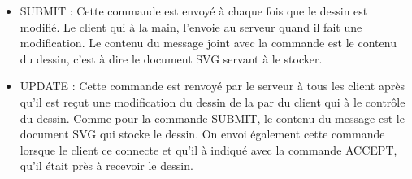 \documentclass[a4paper,10pt]{article}
\begin{document}
\begin{multicols}{2}
\begin{itemize}
\item SUBMIT : Cette commande est envoyé à chaque fois que le dessin est modifié. Le client qui à la main, l'envoie au serveur quand il fait une modification. Le contenu du message joint avec la commande est le contenu du dessin, c'est à dire le document SVG servant à le stocker.

\item UPDATE : Cette commande est renvoyé par le serveur à tous les client après qu'il est reçut une modification du dessin de la par du client qui à le contrôle du dessin. Comme pour la commande SUBMIT, le contenu du message est le document SVG qui stocke le dessin.
On envoi également cette commande lorsque le client ce connecte et qu'il à indiqué avec la commande ACCEPT, qu'il était près à recevoir le dessin.

\end{itemize}



\end{multicols}
\end{document}
